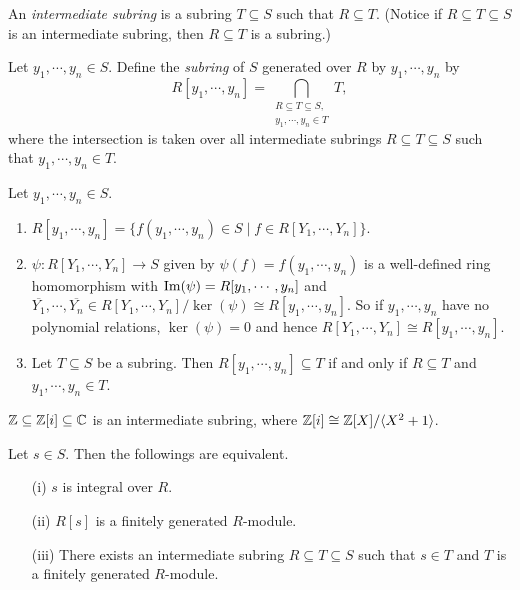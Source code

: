 \begin{definition}
    An \emph{intermediate subring} is a subring $T \subseteq S$ such that $R \subseteq T$. (Notice if $R \subseteq T \subseteq S$ is an intermediate subring, then $R \subseteq T$ is a subring.) \par
    Let $y_1,\cdots,y_n \in S$. Define the \emph{subring} of $S$ generated over $R$ by $y_1,\cdots,y_n$ by
    \[R[y_1,\cdots,y_n] = \bigcap_{\substack{R \subseteq T \subseteq S, \\ y_1,\cdots,y_n \in T}}T,\]
    where the intersection is taken over all intermediate subrings $R \subseteq T \subseteq S$ such that $y_1,\cdots,y_n \in T$. \par
\end{definition}

\begin{fact}
    Let $y_1,\cdots,y_n \in S$.
    \begin{enumerate}
        \item $R[y_1,\cdots,y_n] = \{f(y_1,\cdots,y_n) \in S \mid f \in R[Y_1,\cdots,Y_n]\}$.
        \item $\psi: R[Y_1,\cdots,Y_n] \to S$ given by $\psi(f) = f(y_1,\cdots,y_n)$ is a well-defined ring homomorphism with $\operatorname{Im}(\psi) = R[y_1,\cdots,y_n]$ and $\overbar{Y_1},\cdots,\overbar {Y_n} \in R[Y_1,\cdots,Y_n]/\ker(\psi) \cong R[y_1,\cdots,y_n]$. So if $y_1,\cdots,y_n$ have no polynomial relations, $\ker(\psi) = 0$ and hence $R[Y_1,\cdots,Y_n] \cong R[y_1,\cdots,y_n]$.
        \item Let $T \subseteq S$ be a subring. Then $R[y_1,\cdots,y_n] \subseteq T$ if and only if $R \subseteq T$ and $y_1,\cdots,y_n \in T$.
    \end{enumerate}
\end{fact}

\begin{example}
    $\mathbb{Z} \subseteq \mathbb{Z}[i] \subseteq \mathbb{C}$ is an intermediate subring, where $\mathbb{Z}[i] \cong \mathbb{Z}[X]/\langle X^{2}+1 \rangle$.
\end{example}

\begin{proposition}
    Let $s \in S$. Then the followings are equivalent. 
    \begin{enumerate}
        \item[(i)] $s$ is integral over $R$.
        \item[(ii)] $R[s]$ is a finitely generated $R$-module.
        \item[(iii)] There exists an intermediate subring $R \subseteq T \subseteq S$ such that $s \in T$ and $T$ is a finitely generated $R$-module.
    \end{enumerate}
\end{proposition}

